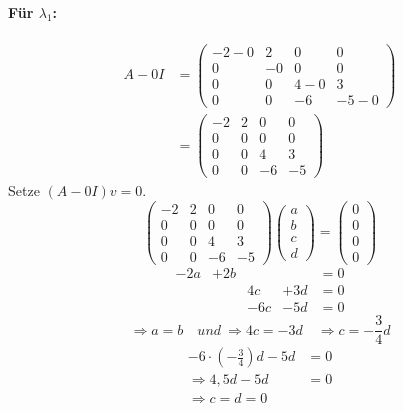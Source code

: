 \documentclass{article} %
\begin{document}
\paragraph{Für $\lambda_1$:}
\begin{align*}
        A - 0I &  = \begin{pmatrix}
    -2 - 0 & 2 & 0 & 0\\ 
    0 &- 0 & 0 & 0 \\
    0 & 0 & 4 - 0  & 3 \\
    0 & 0 & -6 & -5 - 0
    \end{pmatrix} \\
   &  = \begin{pmatrix}
    -2 & 2 & 0 & 0 \\ 
    0 &0 &0 & 0 \\
    0 & 0 & 4   & 3 \\
    0 & 0 & -6 & -5
    \end{pmatrix}
\end{align*}
    Setze $ (A - 0I)v = 0$.
\[\begin{pmatrix}
    -2 & 2 & 0 & 0 \\ 
     0 & 0 & 0 & 0\\
    0 & 0 & 4  & 3 \\
    0 & 0 & -6 & -5 
    \end{pmatrix} \begin{pmatrix}
       a \\ b \\ c \\ d 
    \end{pmatrix}  = \begin{pmatrix}
       0 \\ 0 \\0 \\ 0
    \end{pmatrix}\]
    \[  \begin{array}{cccccc}
       -2a  & +2b &  &  & = 0  \\
       &&  4c & +3d & = 0 \\
        && -6c & -5d & = 0
    \end{array} \] 
    \[  \Rightarrow a = b   \quad  und \  \Rightarrow 4c = -3d \quad  
   \Rightarrow c = -\frac{3}{4}d \]
\begin{align*}
   -6 \cdot (-\frac{3}{4})d -5d  & = 0 \\
    \Rightarrow  4,5d -5d & = 0 \\
   \Rightarrow c = d = 0 
\end{align*}
\end{document}
